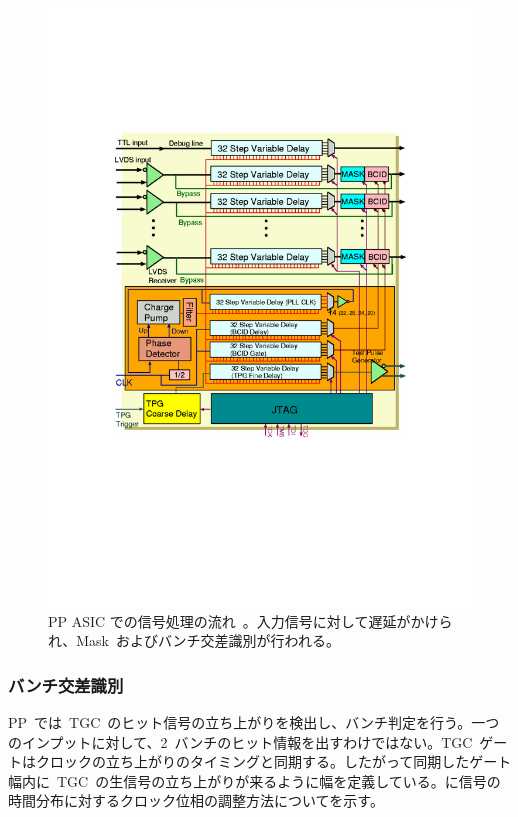 \begin{figure}[H]
        \centering   
        \includegraphics[width=\textwidth,page=1]{img/pdf/PP.pdf}
        \caption[PP ASIC での信号処理の流れ]{PP ASIC での信号処理の流れ~\cite{URL:05}。入力信号に対して遅延がかけられ、Mask~およびバンチ交差識別が行われる。}
        \label{fig:PP}
\end{figure}

\subsubsection{バンチ交差識別}\label{subsubsec:bcid}
PP~では~TGC~のヒット信号の立ち上がりを検出し、バンチ判定を行う。一つのインプットに対して、2~バンチのヒット情報を出すわけではない。TGC~ゲートはクロックの立ち上がりのタイミングと同期する。したがって同期したゲート幅内に~TGC~の生信号の立ち上がりが来るように幅を定義している。に信号の時間分布に対するクロック位相の調整方法についてを示す。

